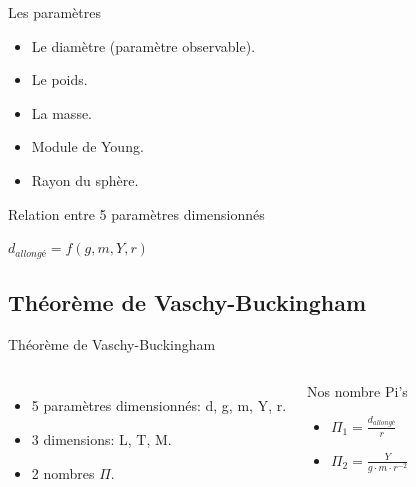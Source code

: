 \begin{frame}{Les paramètres}
    \begin{itemize}
        \item Le diamètre (paramètre observable).
        \item Le poids.
        \item La masse.
        \item Module de Young.
        \item Rayon du sphère.
    \end{itemize}
    \begin{block}{Relation entre 5 paramètres dimensionnés}
        \begin{center}
            \(d_{allongé}=f(g,m,Y,r)\)
        \end{center}
    \end{block}
\end{frame}

\subsection{Théorème de Vaschy-Buckingham}
\begin{frame}{Théorème de Vaschy-Buckingham}
    \begin{columns}
        \begin{itemize}
            \item 5 paramètres dimensionnés: d, g, m, Y, r.
            \item 3 dimensions: L, T, M.
            \item 2 nombres $\Pi$.
        \end{itemize}
        \begin{block}{Nos nombre Pi's}   
            \begin{itemize}
                \item \(\Pi_1 = \frac{d_{allongé}}{r}\)
                \item \(\Pi_2 = \frac{Y}{g\cdot m\cdot r^{-2}}\)
            \end{itemize}
        \end{block}
    \end{columns}
\end{frame}
